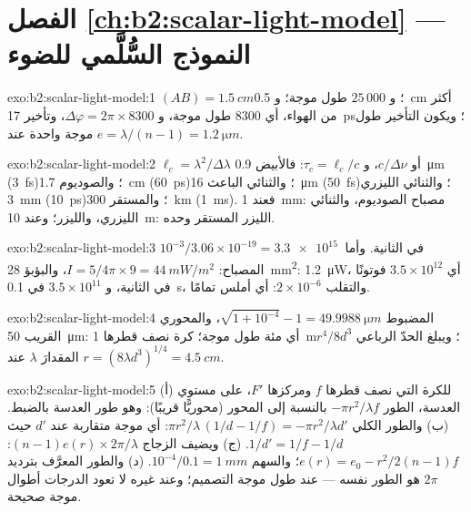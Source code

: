 \section*{الفصل \ref{ch:b2:scalar-light-model} --- النموذج السُّلَّمي للضوء}

\begin{solution}{exo:b2:scalar-light-model:1}
$(AB) = \qty{1.5}{cm}$؛ و $25\,000$ طول موجة؛ و \qty{0.5}{cm} أكثر من الهواء، أي $8300$
طول موجة، و $\Delta\varphi = 2\pi \times 8300$، وتأخير \qty{17}{ps}؛ ويكون التأخير طول
موجة واحدة عند $e = \lambda/(n - 1) = \qty{1.2}{\micro m}$.
\end{solution}

\begin{solution}{exo:b2:scalar-light-model:2}
$\ell_c = \lambda^2/\Delta\lambda$ أو $c/\Delta\nu$، و $\tau_c = \ell_c/c$: فالأبيض \qty{0.9}{\micro m} (\qty{3}{fs})؛
والصوديوم \qty{1.7}{cm} (\qty{60}{ps})؛ والثنائي الباعث \qty{16}{\micro m} (\qty{50}{fs})؛ والثنائي الليزري \qty{3}{mm}
(\qty{10}{ps})؛ والمستقر \qty{300}{km} (\qty{1}{ms}). فعند \qty{1}{mm}: مصباح الصوديوم،
والثنائي الليزري، والليزر؛ وعند \qty{10}{m}: الليزر المستقر وحده.
\end{solution}

\begin{solution}{exo:b2:scalar-light-model:3}
$10^{-3}/3.06 \times 10^{-19} = \qty{3.3e15}{}$ في الثانية. وأما المصباح: $I = 5/4\pi \times 9 =
\qty{44}{mW/m^2}$، والبؤبؤ \qty{28}{mm^2}: \qty{1.2}{\micro W}، أي $3.5 \times 10^{12}$ فوتونًا في الثانية،
و $3.5 \times 10^{11}$ في \qty{0.1}{s}، والتقلب $2 \times 10^{-6}$: أي أملس تمامًا.
\end{solution}

\begin{solution}{exo:b2:scalar-light-model:4}
المضبوط $\sqrt{1 + 10^{-4}} - 1 = \qty{49.9988}{\micro m}$، والمحوري القريب \qty{50}{\micro m}: أي
مئة طول موجة؛  كرة نصف قطرها \qty{1}{m}؛ ويبلغ
الحدّ الرباعي $r^4/8d^3$ المقدارَ $\lambda$ عند $r = (8\lambda d^3)^{1/4} = \qty{4.5}{cm}$.
\end{solution}

\begin{solution}{exo:b2:scalar-light-model:5}
(أ) للكرة التي نصف قطرها $f$ ومركزها $F'$، على مستوي العدسة،
الطور $-\pi r^2/\lambda f$ بالنسبة إلى المحور (محوريًّا قريبًا): وهو طور
العدسة بالضبط. (ب) والطور الكلي $\pi r^2/\lambda\,(1/d - 1/f) = -\pi r^2/\lambda d'$: أي موجة
متقاربة عند $d'$ حيث $1/d' = 1/f - 1/d$. (ج) ويضيف الزجاج $(n - 1)e(r)
\times2\pi/\lambda$: $e(r) = e_0 - r^2/2(n - 1)f$؛ والسهم $10^{-4}/0.1 = \qty{1}{mm}$. (د) والطور
المعرَّف بترديد $2\pi$ هو الطور نفسه --- عند طول موجة
التصميم؛ وعند غيره لا تعود الدرجات أطوال موجة صحيحة.
\end{solution}

